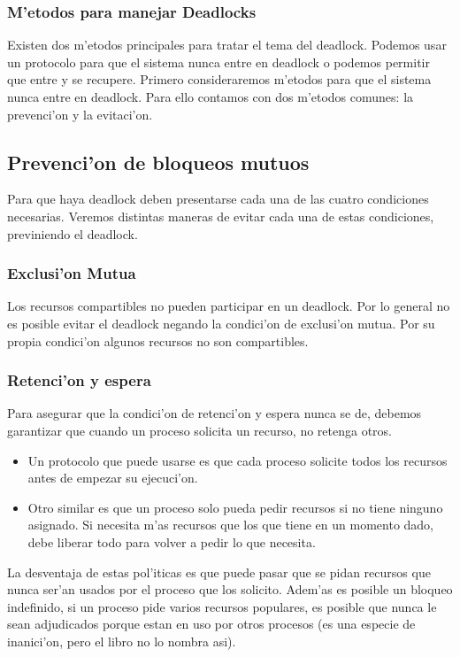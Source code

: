 \documentclass[a4paper,10pt]{article}
\begin{document}
\subsubsection{M'etodos para manejar Deadlocks}
Existen dos m'etodos principales para tratar el tema del deadlock. Podemos usar un protocolo para que el sistema nunca entre en deadlock o podemos permitir que entre y se recupere.
Primero consideraremos m'etodos para que el sistema nunca entre en deadlock. Para ello contamos con dos m'etodos comunes: la prevenci'on y la evitaci'on.

\subsection{Prevenci'on de bloqueos mutuos}
Para que haya deadlock deben presentarse cada una de las cuatro condiciones necesarias. Veremos distintas maneras de evitar cada una de estas condiciones, previniendo el deadlock.

\subsubsection{Exclusi'on Mutua}
Los recursos compartibles no pueden participar en un deadlock.
Por lo general no es posible evitar el deadlock negando la condici'on de exclusi'on mutua. Por su propia condici'on algunos recursos no son compartibles.

\subsubsection{Retenci'on y espera}
Para asegurar que la condici'on de retenci'on y espera nunca se de, debemos garantizar que cuando un proceso solicita un recurso, no retenga otros.
\begin{itemize}
 \item Un protocolo que puede usarse es que cada proceso solicite todos los recursos antes de empezar su ejecuci'on.
 \item Otro similar es que un proceso solo pueda pedir recursos si no tiene ninguno asignado. Si necesita m'as recursos que los que tiene en un momento dado, debe liberar todo para volver a pedir lo que necesita.
\end{itemize} 
La desventaja de estas pol'iticas es que puede pasar que se pidan recursos que nunca ser'an usados por el proceso que los solicito.
Adem'as es posible un bloqueo indefinido, si un proceso pide varios recursos populares, es posible que nunca le sean adjudicados porque estan en uso por otros procesos (es una especie de inanici'on, pero el libro no lo nombra asi).
\end{document}
